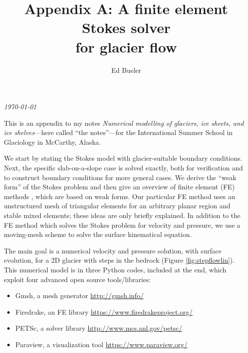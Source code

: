 \documentclass[letterpaper,final,12pt,reqno]{amsart}
\begin{document}
\graphicspath{{figures/}}

\title[Appendix A: A finite element Stokes solver for glacier flow]{Appendix A: A finite element Stokes solver \\ for glacier flow}

\author{Ed Bueler}

\maketitle

\vspace{-8mm}
\begin{center}
\footnotesize
\emph{\today}
\end{center}

\thispagestyle{empty}
\bigskip

\renewcommand{\theequation}{A\arabic{equation}}

This is an appendix to my notes \emph{Numerical modelling of glaciers, ice sheets, and ice shelves}---here called ``the notes''---for the International Summer School in Glaciology in McCarthy, Alaska.

We start by stating the Stokes model with glacier-suitable boundary conditions.  Next, the specific slab-on-a-slope case is solved exactly, both for verification and to construct boundary conditions for more general cases.  We derive the ``weak form'' of the Stokes problem and then give an overview of finite element (FE) methods \cite{Elmanetal2014}, which are based on weak forms.  Our particular FE method uses an unstructured mesh of triangular elements for an arbitrary planar region and stable mixed elements; these ideas are only briefly explained.  In addition to the FE method which solves the Stokes problem for velocity and pressure, we use a moving-mesh scheme to solve the surface kinematical equation.

The main goal is a numerical velocity and pressure solution, with surface evolution, for a 2D glacier with steps in the bedrock (Figure \ref{fig:stepflowlin}).  This numerical model is in three Python codes, included at the end, which exploit four advanced open source tools/libraries:
\begin{itemize}
\item Gmsh, a mesh generator \hfill \url{http://gmsh.info/}
\item Firedrake, an FE library \hfill \url{https://www.firedrakeproject.org/}
\item PETSc, a solver library \hfill \url{http://www.mcs.anl.gov/petsc/}
\item Paraview, a visualization tool \hfill \url{https://www.paraview.org/}
\end{itemize}
\end{document}
